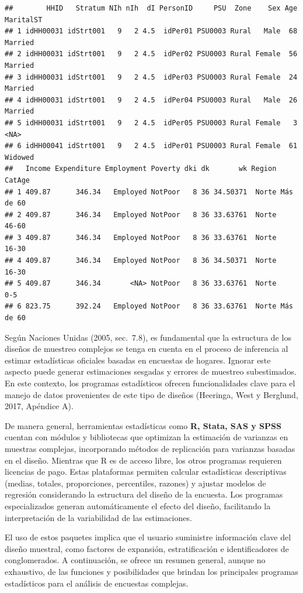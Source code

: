 \documentclass[
  spanish,
  12pt,
]{book}
\begin{document}
\begin{verbatim}
##        HHID   Stratum NIh nIh  dI PersonID     PSU  Zone    Sex Age MaritalST
## 1 idHH00031 idStrt001   9   2 4.5  idPer01 PSU0003 Rural   Male  68   Married
## 2 idHH00031 idStrt001   9   2 4.5  idPer02 PSU0003 Rural Female  56   Married
## 3 idHH00031 idStrt001   9   2 4.5  idPer03 PSU0003 Rural Female  24   Married
## 4 idHH00031 idStrt001   9   2 4.5  idPer04 PSU0003 Rural   Male  26   Married
## 5 idHH00031 idStrt001   9   2 4.5  idPer05 PSU0003 Rural Female   3      <NA>
## 6 idHH00041 idStrt001   9   2 4.5  idPer01 PSU0003 Rural Female  61   Widowed
##   Income Expenditure Employment Poverty dki dk       wk Region    CatAge
## 1 409.87      346.34   Employed NotPoor   8 36 34.50371  Norte Más de 60
## 2 409.87      346.34   Employed NotPoor   8 36 33.63761  Norte     46-60
## 3 409.87      346.34   Employed NotPoor   8 36 33.63761  Norte     16-30
## 4 409.87      346.34   Employed NotPoor   8 36 34.50371  Norte     16-30
## 5 409.87      346.34       <NA> NotPoor   8 36 33.63761  Norte       0-5
## 6 823.75      392.24   Employed NotPoor   8 36 33.63761  Norte Más de 60
\end{verbatim}

Según Naciones Unidas (2005, sec.~7.8), es fundamental que la estructura de los diseños de muestreo complejos se tenga en cuenta en el proceso de inferencia al estimar estadísticas oficiales basadas en encuestas de hogares. Ignorar este aspecto puede generar estimaciones sesgadas y errores de muestreo subestimados. En este contexto, los programas estadísticos ofrecen funcionalidades clave para el manejo de datos provenientes de este tipo de diseños (Heeringa, West y Berglund, 2017, Apéndice A).

De manera general, herramientas estadísticas como \textbf{R, Stata, SAS y SPSS} cuentan con módulos y bibliotecas que optimizan la estimación de varianzas en muestras complejas, incorporando métodos de replicación para varianzas basadas en el diseño. Mientras que R es de acceso libre, los otros programas requieren licencias de pago. Estas plataformas permiten calcular estadísticas descriptivas (medias, totales, proporciones, percentiles, razones) y ajustar modelos de regresión considerando la estructura del diseño de la encuesta. Los programas especializados generan automáticamente el efecto del diseño, facilitando la interpretación de la variabilidad de las estimaciones.

El uso de estos paquetes implica que el usuario suministre información clave del diseño muestral, como factores de expansión, estratificación e identificadores de conglomerados. A continuación, se ofrece un resumen general, aunque no exhaustivo, de las funciones y posibilidades que brindan los principales programas estadísticos para el análisis de encuestas complejas.
\end{document}

